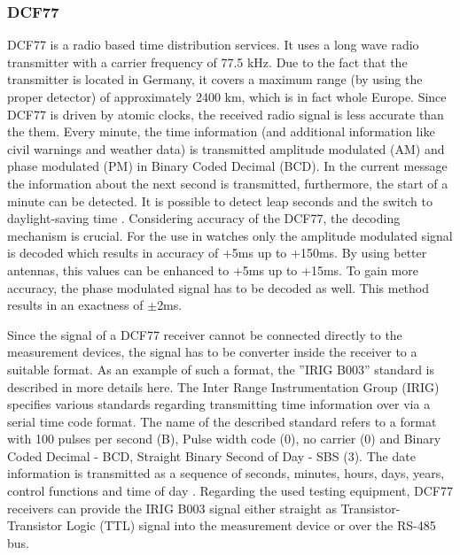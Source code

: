\subsubsection{DCF77}
DCF77 is a radio based time distribution services. It uses a long wave radio transmitter with a carrier frequency of 77.5 kHz. Due to the fact that the transmitter is located in Germany, it covers a maximum range (by using the proper detector) of approximately 2400 km, which is in fact whole Europe. Since DCF77 is driven by atomic clocks, the received radio signal is less accurate than the them\cite{dcf77}. Every minute, the time information (and additional information like civil warnings\cite{dcf77_2} and weather data\cite{dcf77}) is transmitted amplitude modulated (AM) and phase modulated (PM) in Binary Coded Decimal (BCD). In the current message the information about the next second is transmitted, furthermore, the start of a minute can be detected. It is possible to detect leap seconds and the switch to daylight-saving time \cite{dcf77_2}. Considering accuracy of the DCF77, the decoding mechanism is crucial. For the use in watches only the amplitude modulated signal is decoded which results in accuracy of +5ms up to +150ms. By using better antennas, this values can be enhanced to +5ms up to +15ms. To gain more accuracy, the phase modulated signal has to be decoded as well. This method results in an exactness of $\pm$2ms\cite{dcf77_3}.

Since the signal of a DCF77 receiver cannot be connected directly to the measurement devices, the signal has to be converter inside the receiver to a suitable format. As an example of such a format, the ''IRIG B003'' standard is described in more details here. The Inter Range Instrumentation Group (IRIG) specifies various standards regarding transmitting time information over via a serial time code format. The name of the described standard refers to a format with 100 pulses per second (B), Pulse width code (0), no carrier (0) and Binary Coded Decimal - BCD, Straight Binary Second of Day - SBS (3). The date information is transmitted as a sequence of seconds, minutes, hours, days, years, control functions and time of day \cite{irig}. Regarding the used testing equipment, DCF77 receivers can provide the IRIG B003 signal either straight as Transistor-Transistor Logic (TTL) signal into the measurement device or over the RS-485 bus.

